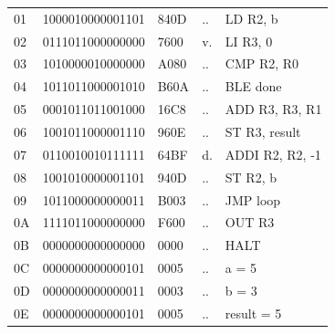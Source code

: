 \begin{tcolorbox}[stepbox, title={Instruction 8 \hfill ticks 22 to 24 \quad ADDI R2, R2, -1}]
{\begin{tabular}{@{}lllll@{}}
01 & 1000010000001101 & 840D & .. & LD R2, b\\
02 & 0111011000000000 & 7600 & v. & LI R3, 0\\
03 & 1010000010000000 & A080 & .. & CMP R2, R0\\
04 & 1011011000001010 & B60A & .. & BLE done\\
05 & 0001011011001000 & 16C8 & .. & ADD R3, R3, R1\\
06 & 1001011000001110 & 960E & .. & ST R3, result\\
07 & 0110010010111111 & 64BF & d. & ADDI R2, R2, -1\\
\rowcolor{pcc}08 & 1001010000001101 & 940D & .. & ST R2, b\\
09 & 1011000000000011 & B003 & .. & JMP loop\\
0A & 1111011000000000 & F600 & .. & OUT R3\\
0B & 0000000000000000 & 0000 & .. & HALT\\
\rowcolor{datac}0C & 0000000000000101 & 0005 & .. & a = 5\\
\rowcolor{datac}0D & 0000000000000011 & 0003 & .. & b = 3\\
\rowcolor{datac}0E & 0000000000000101 & 0005 & .. & result = 5\\
\end{tabular}}
\end{tcolorbox}\par\vspace{3pt}

